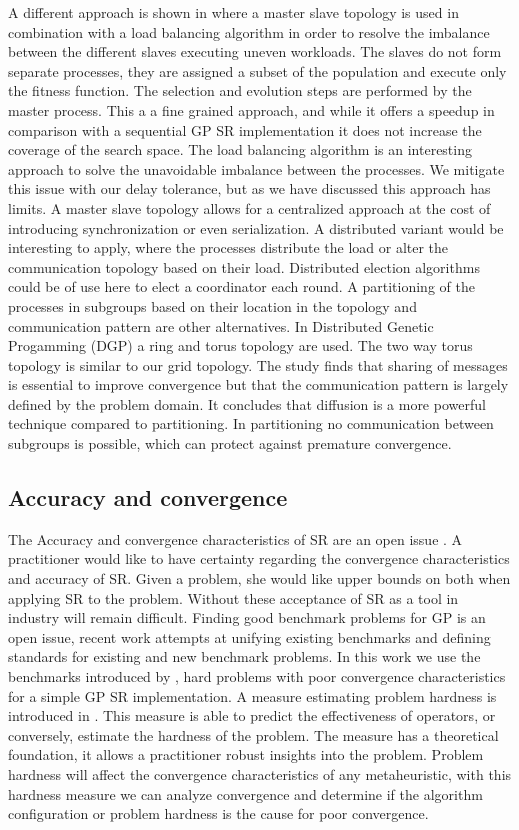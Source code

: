 A different approach is shown in \citep{DFGPSR} where a master slave topology is used in combination with a load balancing algorithm in order to resolve the imbalance between the different slaves executing uneven workloads. The slaves do not form separate processes, they are assigned a subset of the population and execute only the fitness function. The selection and evolution steps are performed by the master process. This a a fine grained approach, and while it offers a speedup in comparison with a sequential GP SR implementation it does not increase the coverage of the search space. The load balancing algorithm is an interesting approach to solve the unavoidable imbalance between the processes. We mitigate this issue with our delay tolerance, but as we have discussed this approach has limits. A master slave topology allows for a centralized approach at the cost of introducing synchronization or even serialization. A distributed variant would be interesting to apply, where the processes distribute the load or alter the communication topology based on their load. Distributed election algorithms could be of use here to elect a coordinator each round. A partitioning of the processes in subgroups based on their location in the topology and communication pattern are other alternatives.
In Distributed Genetic Progamming (DGP) \cite{DGP} a ring and torus topology are used. The two way torus topology is similar to our grid topology. The study finds that sharing of messages is essential to improve convergence but that the communication pattern is largely defined by the problem domain. It concludes that diffusion is a more powerful technique compared to partitioning. In partitioning no communication between subgroups is possible, which can protect against premature convergence.

\subsection{Accuracy and convergence}
The Accuracy and convergence characteristics of SR are an open issue \citep{SRAccuracy, SRAccur, SRBaseline}. A practitioner would like to have certainty regarding the convergence characteristics and accuracy of SR. Given a problem, she would like upper bounds on both when applying SR to the problem. Without these acceptance of SR as a tool in industry will remain difficult.
Finding good benchmark problems for GP is an open issue, recent work \citep{GPBenchmarks} attempts at unifying existing benchmarks and defining standards for existing and new benchmark problems. In this work we use the benchmarks introduced by \cite{SRAccuracy}, hard problems with poor convergence characteristics for a simple GP SR implementation.
A measure estimating problem hardness is introduced in \citep{GPHardness}. This measure is able to predict the effectiveness of operators, or conversely, estimate the hardness of the problem. The measure has a theoretical foundation, it allows a practitioner robust insights into the problem. Problem hardness will affect the convergence characteristics of any metaheuristic, with this hardness measure we can analyze convergence and determine if the algorithm configuration or problem hardness is the cause for poor convergence.
